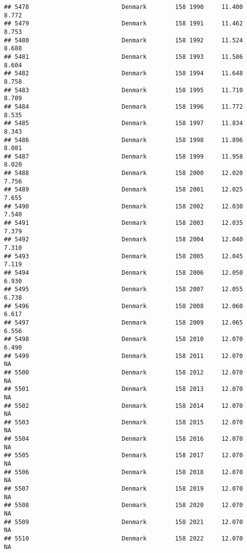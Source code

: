 \documentclass[
]{article}
\begin{document}
\begin{verbatim}
## 5478                          Denmark        158 1990     11.400      8.772
## 5479                          Denmark        158 1991     11.462      8.753
## 5480                          Denmark        158 1992     11.524      8.688
## 5481                          Denmark        158 1993     11.586      8.604
## 5482                          Denmark        158 1994     11.648      8.758
## 5483                          Denmark        158 1995     11.710      8.709
## 5484                          Denmark        158 1996     11.772      8.535
## 5485                          Denmark        158 1997     11.834      8.343
## 5486                          Denmark        158 1998     11.896      8.081
## 5487                          Denmark        158 1999     11.958      8.020
## 5488                          Denmark        158 2000     12.020      7.756
## 5489                          Denmark        158 2001     12.025      7.655
## 5490                          Denmark        158 2002     12.030      7.540
## 5491                          Denmark        158 2003     12.035      7.379
## 5492                          Denmark        158 2004     12.040      7.310
## 5493                          Denmark        158 2005     12.045      7.119
## 5494                          Denmark        158 2006     12.050      6.930
## 5495                          Denmark        158 2007     12.055      6.738
## 5496                          Denmark        158 2008     12.060      6.617
## 5497                          Denmark        158 2009     12.065      6.556
## 5498                          Denmark        158 2010     12.070      6.490
## 5499                          Denmark        158 2011     12.070         NA
## 5500                          Denmark        158 2012     12.070         NA
## 5501                          Denmark        158 2013     12.070         NA
## 5502                          Denmark        158 2014     12.070         NA
## 5503                          Denmark        158 2015     12.070         NA
## 5504                          Denmark        158 2016     12.070         NA
## 5505                          Denmark        158 2017     12.070         NA
## 5506                          Denmark        158 2018     12.070         NA
## 5507                          Denmark        158 2019     12.070         NA
## 5508                          Denmark        158 2020     12.070         NA
## 5509                          Denmark        158 2021     12.070         NA
## 5510                          Denmark        158 2022     12.070         NA

\end{verbatim}
\end{document}
